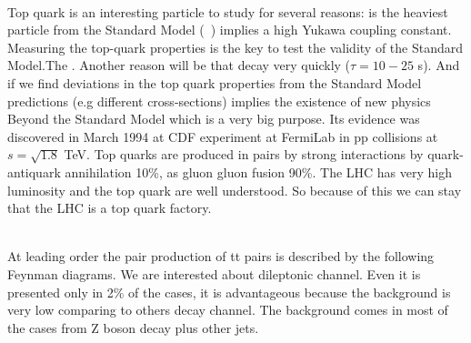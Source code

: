 \ \\Top quark is an interesting particle to study for several reasons: is the heaviest particle from the Standard Model (~\GeVcc) implies a high Yukawa coupling constant. Measuring the top-quark properties is the key to test the validity of the Standard Model.The . Another reason will be that decay very quickly ($\tau=10-25$ s). And if we find deviations in the top quark properties from the Standard Model predictions (e.g different cross-sections) implies the existence of new physics Beyond the Standard Model which is a very big purpose. Its evidence was discovered in March 1994 at CDF experiment at FermiLab in pp collisions at $s=\sqrt{1.8}$ TeV. Top quarks are produced in pairs by strong interactions by quark-antiquark annihilation 10\%, as gluon gluon fusion 90\%. The LHC has very high luminosity and the top quark are well understood. So because of this we can stay that the LHC is a top quark factory. 

\ \\At leading order the pair production of tt pairs is described by the following Feynman diagrams. We are interested about dileptonic channel. Even it is presented only in 2\% of the cases, it is advantageous because the background is very low comparing to others decay channel. The background comes in most of the cases from Z boson decay plus other jets.
